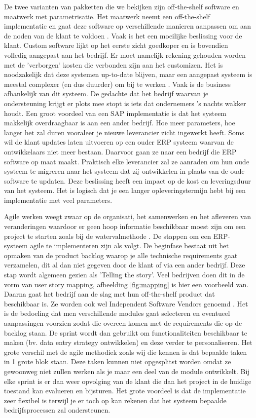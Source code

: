 De twee varianten van pakketten die we bekijken zijn off-the-shelf software en maatwerk met parametrisatie. Het maatwerk neemt een off-the-shelf implementatie en gaat deze software op verschillende manieren aanpassen om aan de noden van de klant te voldoen \autocite{Vollmer2016}. Vaak is het een moeilijke beslissing voor de klant. Custom software lijkt op het eerste zicht goedkoper en is bovendien volledig aangepast aan het bedrijf. Er moet namelijk rekening gehouden worden met de 'verborgen' kosten die verbonden zijn aan het customizen. Het is noodzakelijk dat deze systemen up-to-date blijven, maar een aangepast systeem is meestal complexer (en dus duurder) om bij te werken \autocite{Bdc2019}. Vaak is de business afhankelijk van dit systeem. De gedachte dat het bedrijf waarvan je ondersteuning krijgt er plots mee stopt is iets dat ondernemers 's nachts wakker houdt. Een groot voordeel van een SAP implementatie is dat het systeem makkelijk overdraagbaar is aan een ander bedrijf. Hoe meer parameters, hoe langer het zal duren vooraleer je nieuwe leverancier zicht ingewerkt heeft. Soms wil de klant updates laten uitvoeren op een ouder ERP systeem waarvan de ontwikkelaars niet meer bestaan. Daarvoor gaan ze naar een bedrijf die ERP software op maat maakt. Praktisch elke leverancier zal ze aanraden om hun oude systeem te migreren naar het systeem dat zij ontwikkelen in plaats van de oude software te updaten. Deze beslissing heeft een impact op de kost en leveringsduur van het systeem. Het is logisch dat je een langer opleveringstermijn hebt bij een implementatie met veel parameters.

Agile werken weegt zwaar op de organisati, het samenwerken en het afleveren van veranderingen waardoor er geen hoop informatie beschikbaar moest zijn om een project te starten zoals bij de watervalmethode \autocite{Mrpeasy2018}. De stappen om een ERP-systeem agile te implementeren zijn als volgt. De beginfase bestaat uit het opmaken van de product backlog waarop je alle technische requirements gaat verzamelen, dit al dan niet gegeven door de klant of via een ander bedrijf. Deze stap wordt algemeen gezien als 'Telling the story'. Veel bedrijven doen dit in de vorm van user story mapping, afbeelding \ref{fig:mapping} is hier een voorbeeld van. Daarna gaat het bedrijf aan de slag met hun off-the-shelf product dat beschikbaar is. Ze worden ook wel Independent Software Vendors genoemd \autocite{Mrpeasy2018}. Het is de bedoeling dat men verschillende modules gaat selecteren en eventueel aanpassingen voorzien zodat die overeen komen met de requirements die op de backlog staan. De sprint wordt dan gebruikt om functionaliteiten beschikbaar te maken (bv. data entry strategy ontwikkelen) en deze verder te personaliseren. Het grote verschil met de agile methodiek zoals wij die kennen is dat bepaalde taken in 1 grote blok staan. Deze taken kunnen niet opgesplitst worden omdat ze gewoonweg niet zullen werken als je maar een deel van de module ontwikkelt. Bij elke sprint is er dan weer opvolging van de klant die dan het project in de huidige toestand kan evalueren en bijsturen. Het grote voordeel is dat de implementatie zeer flexibel is terwijl je er toch op kan rekenen dat het systeem bepaalde bedrijfsprocessen zal ondersteunen.

